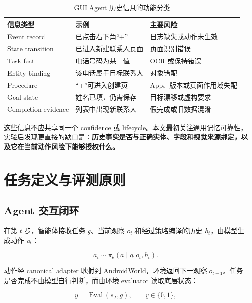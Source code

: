 \documentclass[12pt,a4paper]{ctexart}
\begin{document}
\begin{table}[H]
    \centering
    \caption{GUI Agent 历史信息的功能分类}
    \label{tab:memory-types}
    \small
    \begin{tabularx}{\textwidth}{p{3.0cm}p{5.1cm}Y}
        \toprule
        信息类型 & 示例 & 主要风险 \\
        \midrule
        Event record & 已点击右下角“+” & 日志缺失或动作未生效 \\
        State transition & 已进入新建联系人页面 & 页面识别错误 \\
        Task fact & 电话号码为某一值 & OCR 或保持错误 \\
        Entity binding & 该电话属于目标联系人 & 对象错配 \\
        Procedure & “+”可进入创建页 & App、版本或页面作用域失配 \\
        Goal state & 姓名已填，仍需保存 & 目标漂移或虚构要求 \\
        Completion evidence & 列表中出现新联系人 & 假完成或旧数据混淆 \\
        \bottomrule
    \end{tabularx}
\end{table}

这些信息不应共享同一个 confidence 或 lifecycle。本文最初关注通用记忆可靠性，实验后发现更直接的缺口是：\textbf{历史事实是否与正确实体、字段和视觉来源绑定，以及它在当前动作风险下能够授权什么。}

\section{任务定义与评测原则}

\subsection{Agent 交互闭环}

在第 $t$ 步，智能体接收任务 $g$、当前观察 $o_t$ 和经过策略编译的历史 $h_t$，由模型生成动作 $a_t$：

\begin{equation}
    a_t \sim \pi_\theta(a\mid g,o_t,h_t).
\end{equation}

动作经 canonical adapter 映射到 AndroidWorld，环境返回下一观察 $o_{t+1}$。任务是否完成不由模型自行判断，而由环境 evaluator 读取底层状态：

\begin{equation}
    y = \operatorname{Eval}(s_T,g), \qquad y\in\{0,1\},
\end{equation}
\end{document}
